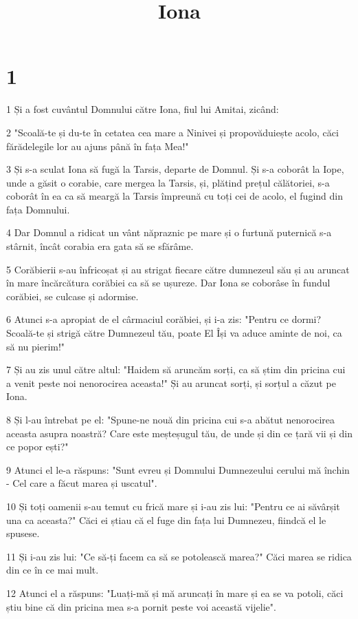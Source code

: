 

\title{Iona}


\chapter{1}

\par 1 Și a fost cuvântul Domnului către Iona, fiul lui Amitai, zicând:
\par 2 "Scoală-te și du-te în cetatea cea mare a Ninivei și propovăduiește acolo, căci fărădelegile lor au ajuns până în fața Mea!"
\par 3 Și s-a sculat Iona să fugă la Tarsis, departe de Domnul. Și s-a coborât la Iope, unde a găsit o corabie, care mergea la Tarsis, și, plătind prețul călătoriei, s-a coborât în ea ca să meargă la Tarsis împreună cu toți cei de acolo, el fugind din fața Domnului.
\par 4 Dar Domnul a ridicat un vânt năpraznic pe mare și o furtună puternică s-a stârnit, încât corabia era gata să se sfărâme.
\par 5 Corăbierii s-au înfricoșat și au strigat fiecare către dumnezeul său și au aruncat în mare încărcătura corăbiei ca să se ușureze. Dar Iona se coborâse în fundul corăbiei, se culcase și adormise.
\par 6 Atunci s-a apropiat de el cârmaciul corăbiei, și i-a zis: "Pentru ce dormi? Scoală-te și strigă către Dumnezeul tău, poate El Își va aduce aminte de noi, ca să nu pierim!"
\par 7 Și au zis unul către altul: "Haidem să aruncăm sorți, ca să știm din pricina cui a venit peste noi nenorocirea aceasta!" Și au aruncat sorți, și sorțul a căzut pe Iona.
\par 8 Și l-au întrebat pe el: "Spune-ne nouă din pricina cui s-a abătut nenorocirea aceasta asupra noastră? Care este meșteșugul tău, de unde și din ce țară vii și din ce popor ești?"
\par 9 Atunci el le-a răspuns: "Sunt evreu și Domnului Dumnezeului cerului mă închin - Cel care a făcut marea și uscatul".
\par 10 Și toți oamenii s-au temut cu frică mare și i-au zis lui: "Pentru ce ai săvârșit una ca aceasta?" Căci ei știau că el fuge din fața lui Dumnezeu, fiindcă el le spusese.
\par 11 Și i-au zis lui: "Ce să-ți facem ca să se potolească marea?" Căci marea se ridica din ce în ce mai mult.
\par 12 Atunci el a răspuns: "Luați-mă și mă aruncați în mare și ea se va potoli, căci știu bine că din pricina mea s-a pornit peste voi această vijelie".

